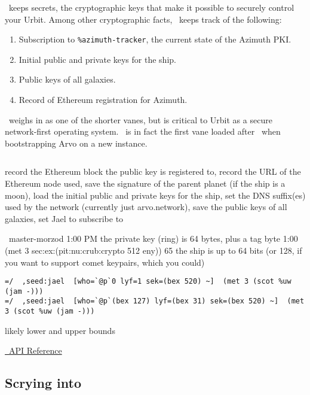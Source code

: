 \jael~keeps secrets, the cryptographic keys that make it possible to securely control your Urbit.  Among other cryptographic facts, \jael~keeps track of the following:

\begin{enumerate}
  \item  Subscription to \texttt{\%azimuth-tracker}, the current state of the Azimuth PKI.
  \item  Initial public and private keys for the ship.
  \item  Public keys of all galaxies.
  \item  Record of Ethereum registration for Azimuth.
\end{enumerate}

\jael~weighs in as one of the shorter vanes, but is critical to Urbit as a secure network-first operating system.  \jael~is in fact the first vane loaded after \dill~when bootstrapping Arvo on a new instance.

\begin{lstlisting}

\end{lstlisting}


record the Ethereum block the public key is registered to,
record the URL of the Ethereum node used,
save the signature of the parent planet (if the ship is a moon),
load the initial public and private keys for the ship,
set the DNS suffix(es) used by the network (currently just arvo.network),
save the public keys of all galaxies,
set Jael to subscribe to %

~master-morzod
1:00 PM
the private key (ring) is 64 bytes, plus a tag byte
1:00
(met 3 sec:ex:(pit:nu:crub:crypto 512 eny))
65
the ship is up to 64 bits (or 128, if you want to support comet keypairs, which you could)
\begin{lstlisting}
=/  ,seed:jael  [who=`@p`0 lyf=1 sek=(bex 520) ~]  (met 3 (scot %uw (jam -)))
=/  ,seed:jael  [who=`@p`(bex 127) lyf=(bex 31) sek=(bex 520) ~]  (met 3 (scot %uw (jam -)))
\end{lstlisting}
likely lower and upper bounds


\href{https://urbit.org/docs/arvo/jael/jael-api/}{\jael~API Reference}



\subsection{Scrying into \jael}




